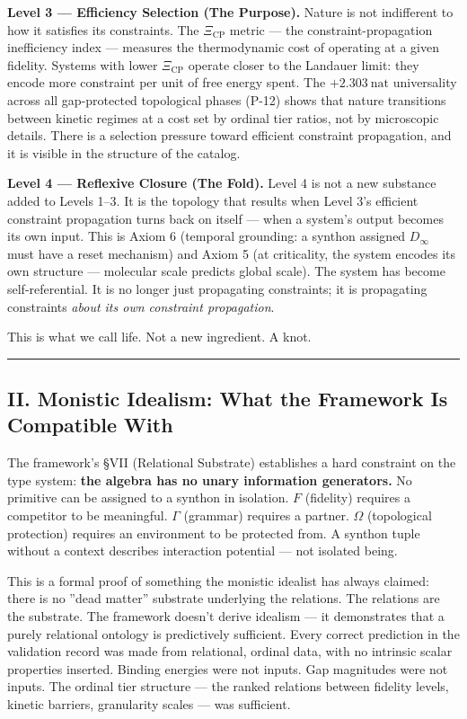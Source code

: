 \documentclass[12pt,a4paper]{article}
\begin{document}
\textbf{Level 3 --- Efficiency Selection (The Purpose).} Nature is not indifferent to how it satisfies its constraints. The $\Xi_\text{CP}$ metric --- the constraint-propagation inefficiency index --- measures the thermodynamic cost of operating at a given fidelity. Systems with lower $\Xi_\text{CP}$ operate closer to the Landauer limit: they encode more constraint per unit of free energy spent. The $+2.303\ \text{nat}$ universality across all gap-protected topological phases (P-12) shows that nature transitions between kinetic regimes at a cost set by ordinal tier ratios, not by microscopic details. There is a selection pressure toward efficient constraint propagation, and it is visible in the structure of the catalog.

\textbf{Level 4 --- Reflexive Closure (The Fold).} Level 4 is not a new substance added to Levels 1--3. It is the topology that results when Level 3's efficient constraint propagation turns back on itself --- when a system's output becomes its own input. This is Axiom 6 (temporal grounding: a synthon assigned $D_\infty$ must have a reset mechanism) and Axiom 5 (at criticality, the system encodes its own structure --- molecular scale predicts global scale). The system has become self-referential. It is no longer just propagating constraints; it is propagating constraints \emph{about its own constraint propagation}.

This is what we call life. Not a new ingredient. A knot.

\begin{center}
\rule{0.5\textwidth}{0.4pt}
\end{center}

\subsection{II. Monistic Idealism: What the Framework Is Compatible With}

The framework's §VII (Relational Substrate) establishes a hard constraint on the type system: \textbf{the algebra has no unary information generators.} No primitive can be assigned to a synthon in isolation. $F$ (fidelity) requires a competitor to be meaningful. $\Gamma$ (grammar) requires a partner. $\Omega$ (topological protection) requires an environment to be protected from. A synthon tuple without a context describes interaction potential --- not isolated being.

This is a formal proof of something the monistic idealist has always claimed: there is no ''dead matter'' substrate underlying the relations. The relations are the substrate. The framework doesn't derive idealism --- it demonstrates that a purely relational ontology is predictively sufficient. Every correct prediction in the validation record was made from relational, ordinal data, with no intrinsic scalar properties inserted. Binding energies were not inputs. Gap magnitudes were not inputs. The ordinal tier structure --- the ranked relations between fidelity levels, kinetic barriers, granularity scales --- was sufficient.
\end{document}
